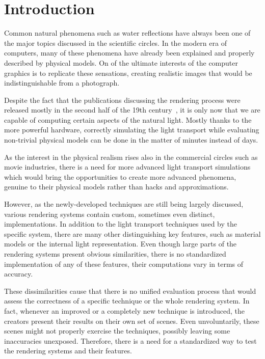 \chapter*{Introduction}

Common natural phenomena such as water reflections have always been one of the major topics discussed in the scientific circles. In the modern era of computers, many of these phenomena have already been explained and properly described by physical models. On of the ultimate interests of the computer graphics is to replicate these sensations, creating realistic images that would be indistinguishable from a photograph.

Despite the fact that the publications discussing the rendering process were released mostly in the second half of the 19th century~\cite{kajiya1986rendering}\cite{nicodemus1965directional}, it is only now that we are capable of computing certain aspects of the natural light. Mostly thanks to the more powerful hardware, correctly simulating the light transport while evaluating non-trivial physical models can be done in the matter of minutes instead of days.

As the interest in the physical realism rises also in the commercial circles such as movie industries, there is a need for more advanced light transport simulations which would bring the opportunities to create more advanced phenomena, genuine to their physical models rather than hacks and approximations.

However, as the newly-developed techniques are still being largely discussed, various rendering systems contain custom, sometimes even distinct, implementations. In addition to the light transport techniques used by the specific system, there are many other distinguishing key features, such as material models or the internal light representation. Even though large parts of the rendering systems present obvious similarities, there is no standardized implementation of any of these features, their computations vary in terms of accuracy.

These dissimilarities cause that there is no unified evaluation process that would assess the correctness of a specific technique or the whole rendering system. In fact, whenever an improved or a completely new technique is introduced, the creators present their results on their own set of scenes. Even unvoluntarily, these scenes might not properly exercise the techniques, possibly leaving some inaccuracies unexposed. Therefore, there is a need for a standardized way to test the rendering systems and their features.

